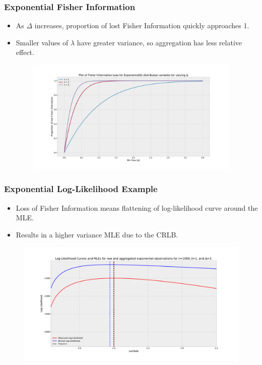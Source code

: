 \documentclass[11pt]{beamer}
\begin{document}
\begin{frame}
	\frametitle{Exponential Fisher Information}
	\begin{itemize}
		\item As $\Delta$ increases, proportion of lost Fisher Information quickly approaches 1.
		\item Smaller values of $\lambda$ have greater variance, so aggregation has less relative effect.
	\end{itemize}
	\begin{figure}[!h]
		\includegraphics[height=5.5cm, width=12cm]{exp_info_loss.pdf}
	\end{figure}
\end{frame}

\begin{frame}
	\frametitle{Exponential Log-Likelihood Example}
	\begin{itemize}
		\item Loss of Fisher Information means flattening of log-likelihood curve around the MLE.
		\item Results in a higher variance MLE due to the CRLB.
	\end{itemize}
	\begin{figure}[!h]
		\includegraphics[height=6cm, width=12cm]{exp_log_likelihood.pdf}
	\end{figure}
\end{frame}
\end{document}
